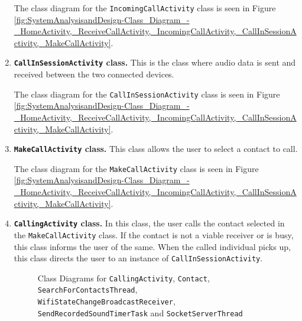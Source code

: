 \documentclass[12pt,svgnames,smaller]{article} %
\begin{document}
\begin{enumerate}
		The class diagram for the \texttt{IncomingCallActivity} class is seen in Figure \ref{fig:SystemAnalysisandDesign-Class_Diagram_-_HomeActivity,_ReceiveCallActivity,_IncomingCallActivity,_CallInSessionActivity,_MakeCallActivity}.
		
		\item \textbf{\texttt{CallInSessionActivity} class.} This is the class where audio data is sent and received between the two connected devices.
		
		The class diagram for the \texttt{CallInSessionActivity} class is seen in Figure \ref{fig:SystemAnalysisandDesign-Class_Diagram_-_HomeActivity,_ReceiveCallActivity,_IncomingCallActivity,_CallInSessionActivity,_MakeCallActivity}.
		
		\item \textbf{\texttt{MakeCallActivity} class.} This class allows the user to select a contact to call.
		
		The class diagram for the \texttt{MakeCallActivity} class is seen in Figure \ref{fig:SystemAnalysisandDesign-Class_Diagram_-_HomeActivity,_ReceiveCallActivity,_IncomingCallActivity,_CallInSessionActivity,_MakeCallActivity}.
		
		\item \textbf{\texttt{CallingActivity} class.} In this class, the user calls the contact selected in the \texttt{MakeCallActivity} class. If the contact is not a viable receiver or is busy, this class informs the user of the same. When the called individual picks up, this class directs the user to an instance of \texttt{CallInSessionActivity}.
		
		\begin{figure}
			\caption{Class Diagrams for \texttt{CallingActivity}, \texttt{Contact}, \texttt{SearchForContactsThread}, 
				\texttt{WifiStateChangeBroadcastReceiver}, \texttt{SendRecordedSoundTimerTask} and \texttt{SocketServerThread}}			\label{fig:SystemAnalysisandDesign-Class_Diagram_-_CallingActivity,_Contact,_SearchForContactsThread,_WifiStateChangeBroadcastReceiver,_SendRecordedSoundTimerTask,_SocketServerThread}
		\end{figure}
		

\end{enumerate}
\end{document}
